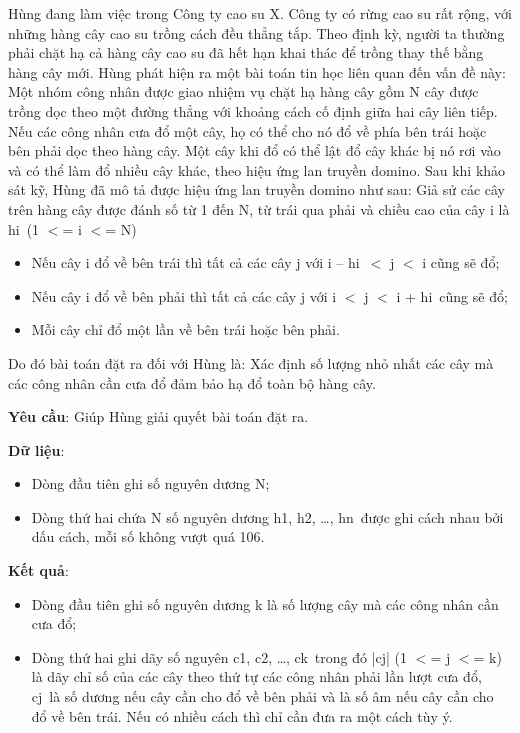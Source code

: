 

Hùng đang làm việc trong Công ty cao su X. Công ty có rừng cao su rất rộng, với những hàng cây cao su trồng cách đều thẳng tắp. Theo định kỳ, người ta thường phải chặt hạ cả hàng cây cao su đã hết hạn khai thác để trồng thay thế bằng hàng cây mới. Hùng phát hiện ra một bài toán tin học liên quan đến vấn đề này: Một nhóm công nhân được giao nhiệm vụ chặt hạ hàng cây gồm N cây được trồng dọc theo một đường thẳng với khoảng cách cố định giữa hai cây liên tiếp. Nếu các công nhân cưa đổ một cây, họ có thể cho nó đổ về phía bên trái hoặc bên phải dọc theo hàng cây. Một cây khi đổ có thể lật đổ cây khác bị nó rơi vào và có thể làm đổ nhiều cây khác, theo hiệu ứng lan truyền domino. Sau khi khảo sát kỹ, Hùng đã mô tả được hiệu ứng lan truyền domino như sau: Giả sử các cây trên hàng cây được đánh số từ 1 đến N, từ trái qua phải và chiều cao của cây i là hi (1 $<$= i $<$= N)
\begin{itemize}
	\item Nếu cây i đổ về bên trái thì tất cả các cây j với i – hi $<$ j $<$ i cũng sẽ đổ;
	\item Nếu cây i đổ về bên phải thì tất cả các cây j với i $<$ j $<$ i + hi cũng sẽ đổ;
	\item Mỗi cây chỉ đổ một lần về bên trái hoặc bên phải.
\end{itemize}

Do đó bài toán đặt ra đối với Hùng là: Xác định số lượng nhỏ nhất các cây mà các công nhân cần cưa đổ đảm bảo hạ đổ toàn bộ hàng cây.

\textbf{Yêu cầu}: Giúp Hùng giải quyết bài toán đặt ra.

\textbf{Dữ liệu}:
\begin{itemize}
	\item Dòng đầu tiên ghi số nguyên dương N;
	\item Dòng thứ hai chứa N số nguyên dương h1, h2, …, hn được ghi cách nhau bởi dấu cách, mỗi số không vượt quá 106.
\end{itemize}

\textbf{Kết quả}:
\begin{itemize}
	\item Dòng đầu tiên ghi số nguyên dương k là số lượng cây mà các công nhân cần cưa đổ;
	\item Dòng thứ hai ghi dãy số nguyên c1, c2, …, ck trong đó |cj| (1 $<$= j $<$= k) là dãy chỉ số của các cây theo thứ tự các công nhân phải lần lượt cưa đổ, cj là số dương nếu cây cần cho đổ về bên phải và là số âm nếu cây cần cho đổ về bên trái. Nếu có nhiều cách thì chỉ cần đưa ra một cách tùy ý.
\end{itemize}

